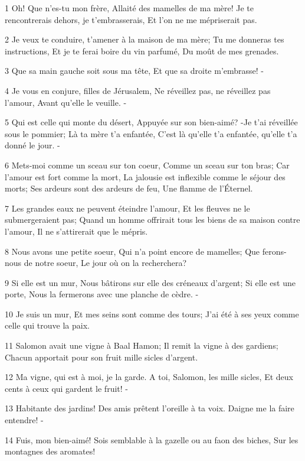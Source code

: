 \par 1 Oh! Que n'es-tu mon frère, Allaité des mamelles de ma mère! Je te rencontrerais dehors, je t'embrasserais, Et l'on ne me mépriserait pas.
\par 2 Je veux te conduire, t'amener à la maison de ma mère; Tu me donneras tes instructions, Et je te ferai boire du vin parfumé, Du moût de mes grenades.
\par 3 Que sa main gauche soit sous ma tête, Et que sa droite m'embrasse! -
\par 4 Je vous en conjure, filles de Jérusalem, Ne réveillez pas, ne réveillez pas l'amour, Avant qu'elle le veuille. -
\par 5 Qui est celle qui monte du désert, Appuyée sur son bien-aimé? -Je t'ai réveillée sous le pommier; Là ta mère t'a enfantée, C'est là qu'elle t'a enfantée, qu'elle t'a donné le jour. -
\par 6 Mets-moi comme un sceau sur ton coeur, Comme un sceau sur ton bras; Car l'amour est fort comme la mort, La jalousie est inflexible comme le séjour des morts; Ses ardeurs sont des ardeurs de feu, Une flamme de l'Éternel.
\par 7 Les grandes eaux ne peuvent éteindre l'amour, Et les fleuves ne le submergeraient pas; Quand un homme offrirait tous les biens de sa maison contre l'amour, Il ne s'attirerait que le mépris.
\par 8 Nous avons une petite soeur, Qui n'a point encore de mamelles; Que ferons-nous de notre soeur, Le jour où on la recherchera?
\par 9 Si elle est un mur, Nous bâtirons sur elle des créneaux d'argent; Si elle est une porte, Nous la fermerons avec une planche de cèdre. -
\par 10 Je suis un mur, Et mes seins sont comme des tours; J'ai été à ses yeux comme celle qui trouve la paix.
\par 11 Salomon avait une vigne à Baal Hamon; Il remit la vigne à des gardiens; Chacun apportait pour son fruit mille sicles d'argent.
\par 12 Ma vigne, qui est à moi, je la garde. A toi, Salomon, les mille sicles, Et deux cents à ceux qui gardent le fruit! -
\par 13 Habitante des jardins! Des amis prêtent l'oreille à ta voix. Daigne me la faire entendre! -
\par 14 Fuis, mon bien-aimé! Sois semblable à la gazelle ou au faon des biches, Sur les montagnes des aromates!


